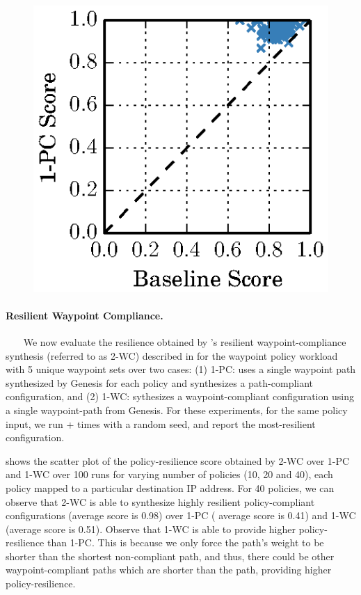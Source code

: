 \begin{figure}
	\begin{center}
		\includegraphics[width=0.20\columnwidth]{figures/ospfbaselineresilience.eps}
	\end{center} 
\end{figure}


\paragraph{Resilient Waypoint Compliance.}~~~
We now evaluate the resilience obtained by \name's
resilient waypoint-compliance synthesis (referred to as 2-WC)
described in 
for the waypoint policy workload with 5 unique waypoint sets 
over two cases: (1) 1-PC: \name uses a single waypoint path
synthesized by Genesis for each policy 
and synthesizes a path-compliant configuration, and 
(2) 1-WC: \name sythesizes a waypoint-compliant configuration
using a single waypoint-path from Genesis. For these 
experiments, for the same policy input, we run \genesis +  times with a random seed, and report the most-resilient configuration.

 shows the scatter plot of the policy-resilience 
score obtained by 2-WC over 1-PC and 1-WC over 100 runs
for varying number of policies (10, 20 and 40), each policy mapped 
to a particular destination IP address. 
For 40 policies, 
we can observe that 2-WC is able to synthesize highly
resilient policy-compliant configurations 
(average score is 0.98) over 1-PC (
average score is 0.41) and 1-WC (average score is 0.51). 
Observe that 
1-WC is able to provide higher policy-resilience than
1-PC. This is because we only
force the \name path's weight to 
be shorter than the shortest 
non-compliant path, and thus, there could be
other waypoint-compliant paths which are 
shorter than the  
\name path, 
providing higher policy-resilience.

